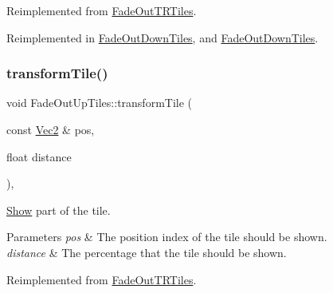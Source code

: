 Reimplemented from \hyperlink{classFadeOutTRTiles_aed87971151a43d41b598a8c65f0e7d8f}{Fade\+Out\+T\+R\+Tiles}.



Reimplemented in \hyperlink{classFadeOutDownTiles_a650db33238577e696174930b01d06045}{Fade\+Out\+Down\+Tiles}, and \hyperlink{classFadeOutDownTiles_a6fa98b6fda5e72b41542f4209866c3f3}{Fade\+Out\+Down\+Tiles}.

\mbox{\label{classFadeOutUpTiles_a408548b6434137f3be0cb47fe43c2e2d}} 
\subsubsection{\texorpdfstring{transform\+Tile()}{transformTile()}\hspace{0.1cm}{\footnotesize\ttfamily [1/2]}}
{\footnotesize\ttfamily void Fade\+Out\+Up\+Tiles\+::transform\+Tile (\begin{DoxyParamCaption}\item[{const \hyperlink{classVec2}{Vec2} \&}]{pos,  }\item[{float}]{distance }\end{DoxyParamCaption})\hspace{0.3cm}{\ttfamily [override]}, {\ttfamily [virtual]}}



\hyperlink{classShow}{Show} part of the tile. 


\begin{DoxyParams}{Parameters}
{\em pos} & The position index of the tile should be shown. \\
\hline
{\em distance} & The percentage that the tile should be shown. \\
\hline
\end{DoxyParams}


Reimplemented from \hyperlink{classFadeOutTRTiles_affe9ea8485d27ecab09eb0e9ee5d0129}{Fade\+Out\+T\+R\+Tiles}.

\mbox{\label{classFadeOutUpTiles_a00c6d04f5b87f24d43dbc6a18dc96670}} 

